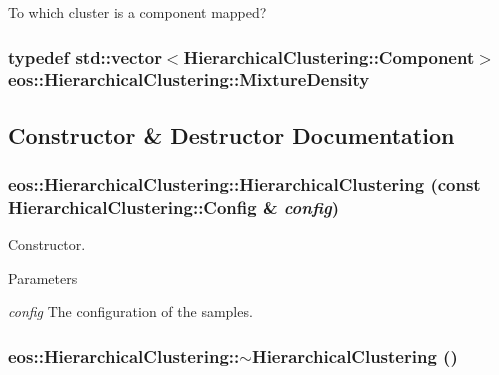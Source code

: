 To which cluster is a component mapped? \hypertarget{classeos_1_1HierarchicalClustering_aa51668b14931e2a8b1697c8f26a8f1c8}{
\subsubsection[{MixtureDensity}]{\setlength{\rightskip}{0pt plus 5cm}typedef std::vector$<${\bf HierarchicalClustering::Component}$>$ {\bf eos::HierarchicalClustering::MixtureDensity}}}
\label{classeos_1_1HierarchicalClustering_aa51668b14931e2a8b1697c8f26a8f1c8}


\subsection{Constructor \& Destructor Documentation}
\hypertarget{classeos_1_1HierarchicalClustering_a7b4792a338b8e9ed7eff4c50b69a6e2f}{
\subsubsection[{HierarchicalClustering}]{\setlength{\rightskip}{0pt plus 5cm}eos::HierarchicalClustering::HierarchicalClustering (const {\bf HierarchicalClustering::Config} \& {\em config})}}
\label{classeos_1_1HierarchicalClustering_a7b4792a338b8e9ed7eff4c50b69a6e2f}
Constructor.


\begin{DoxyParams}{Parameters}
\item[{\em config}]The configuration of the samples. \end{DoxyParams}
\hypertarget{classeos_1_1HierarchicalClustering_a65264d9ee6f203a8ca040644df99bf65}{
\subsubsection[{$\sim$HierarchicalClustering}]{\setlength{\rightskip}{0pt plus 5cm}eos::HierarchicalClustering::$\sim$HierarchicalClustering ()}}
\label{classeos_1_1HierarchicalClustering_a65264d9ee6f203a8ca040644df99bf65}



